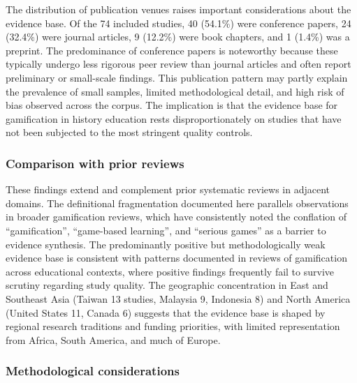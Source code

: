 \documentclass[a4paper,fleqn]{cas-sc}
\begin{document}
The distribution of publication venues raises important considerations about the evidence base. Of the 74 included studies, 40 (54.1\%) were conference papers, 24 (32.4\%) were journal articles, 9 (12.2\%) were book chapters, and 1 (1.4\%) was a preprint. The predominance of conference papers is noteworthy because these typically undergo less rigorous peer review than journal articles and often report preliminary or small-scale findings. This publication pattern may partly explain the prevalence of small samples, limited methodological detail, and high risk of bias observed across the corpus. The implication is that the evidence base for gamification in history education rests disproportionately on studies that have not been subjected to the most stringent quality controls.

\subsubsection{Comparison with prior reviews}

These findings extend and complement prior systematic reviews in adjacent domains. The definitional fragmentation documented here parallels observations in broader gamification reviews, which have consistently noted the conflation of ``gamification'', ``game-based learning'', and ``serious games'' as a barrier to evidence synthesis. The predominantly positive but methodologically weak evidence base is consistent with patterns documented in reviews of gamification across educational contexts, where positive findings frequently fail to survive scrutiny regarding study quality. The geographic concentration in East and Southeast Asia (Taiwan 13 studies, Malaysia 9, Indonesia 8) and North America (United States 11, Canada 6) suggests that the evidence base is shaped by regional research traditions and funding priorities, with limited representation from Africa, South America, and much of Europe.

\subsubsection{Methodological considerations}
\end{document}
